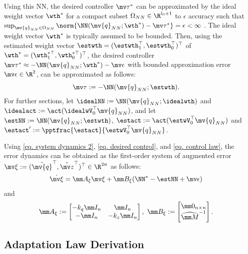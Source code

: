 \documentclass[letterpaper, 10 pt, conference]{ieeeconf}  %
\newcommand*{\q}{\mv{q}}
\begin{document}
Using this NN, the desired controller $\mv \tau^*$ can be approximated by the ideal weight vector $\wth^*$ for a compact subset $\Omega_{NN}\in\R^{l_0+1}$ to $\epsilon$ accuracy such that $\sup_{{\q_{NN}}\in\Omega_{NN}} \allowbreak \norm{\NN({\q_{NN}};\wth^*) - \mv \tau^*}=\epsilon<\infty$ \cite{Cybenko:1989aa}.
The ideal weight vector $\wth^*$ is typically assumed to be bounded.
Then, using the estimated weight vector $\estwth=(\estwth_1^\top ,\estwth_0^\top )^\top $ of $\wth^*=(\wth_1^{*\top},\wth_0^{*\top})^\top $, the desired controller $\mv \tau^*\approx -\NN(\q_{NN};\wth^*)-\mv\epsilon$ with bounded approximation error $\mv \epsilon\in\R^2$, can be approximated as follows:
\begin{equation}
    \mv \tau := -\NN({\q_{NN}};\estwth)
    .
    \label{eq. control law}
\end{equation}
For further sections, let $\idealNN:=\NN({\q_{NN}};\idealwth)$ and $\idealact :=\act({\idealwV}_0^{\top}{\q_{NN}})$, and let $\estNN:={\NN}({\q_{NN}};\estwth)$, $\estact :=\act(\estwV_0^{\top}{\q_{NN}})$ and $\estact' := \pptfrac{\estact}{\estwV_0^\top \q_{NN}}$.

Using \eqref{eq. system dynamics 2}, \eqref{eq. desired control}, and \eqref{eq. control law}, the error dynamics can be obtained as the first-order system of augmented error $\mv \xi:=(\tilde {\q}^\top ,\tilde {\mv z}^\top)^\top \in\R^{2n}$ as follows:
\begin{equation}
    \dot{\mv \xi} 
    = 
    \mm A_\xi{\mv \xi}+\mm B_\xi(\NN^*-\estNN+\mv\epsilon)
\end{equation}
and 
\begin{equation}
    \mm A_\xi := 
    \begin{bmatrix}
        -{k_q} \mm I_{n} &\mm I_{n}
        \\
        -\mm I_{n}& -{k_z} \mm I_{n}
    \end{bmatrix}
    ,\ 
    \mm B_\xi := 
    \begin{bmatrix}
        \mm 0_{n\times n}\\\widehat{\mm M}^{-1}
    \end{bmatrix}.
\end{equation}

\subsection{Adaptation Law Derivation}\label{sec:adap_laws}
\end{document}
